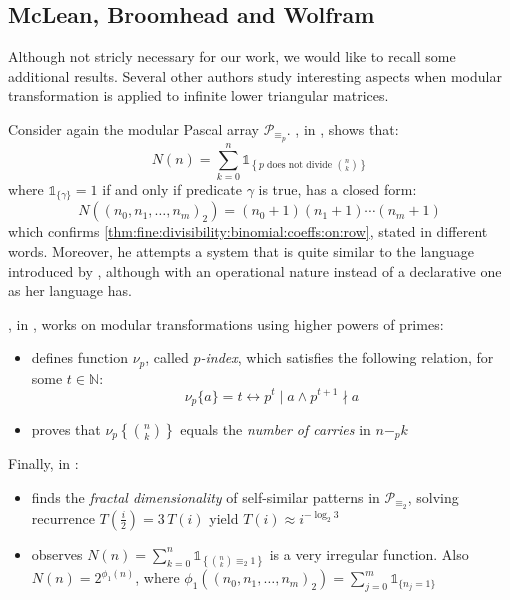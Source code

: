 \subsection{McLean, Broomhead and Wolfram}
\label{subsection:modular:alter:works}
Although not stricly necessary for our work, we would like to recall some
additional results. Several other authors study interesting aspects when
modular transformation is applied to infinite lower triangular matrices.

Consider again the modular Pascal array $\mathcal{P}_{\equiv_{p}}$.
\citeauthor{broomhead:1972}, in \cite{broomhead:1972}, shows that:
\begin{displaymath}
    N(n)=\sum_{k=0}^{n}{\mathbb{1}_{\left\lbrace p\text{ does not divide }{{n}\choose{k}}\right\rbrace}}
\end{displaymath}
where $\mathbb{1}_{\lbrace \gamma \rbrace}=1$ if and only if predicate $\gamma$ is true,
has a closed form:
\begin{displaymath}
    N((n_{0},n_{1},\ldots,n_{m})_{2})=(n_{0}+1)(n_{1}+1)\cdots(n_{m}+1)
\end{displaymath}
which confirms \autoref{thm:fine:divisibility:binomial:coeffs:on:row}, stated in different words.
Moreover, he attempts a system that is quite similar to the language introduced by \citeauthor{sved:1988},
although with an operational nature instead of a declarative one as her language has.

\citeauthor{mclean:1974}, in \cite{mclean:1974}, works on modular transformations using
higher powers of primes:
\begin{itemize}
    \item defines function $\nu_{p}$, called \emph{$p$-index}, which satisfies the following relation,
        for some $t\in\mathbb{N}$: 
        \begin{displaymath}
            \nu_{p}\lbrace a\rbrace =t \leftrightarrow p^{t}\mid a \wedge p^{t+1}\nmid a
        \end{displaymath}
    \item proves that {$\nu_{p}\left\lbrace {{n}\choose{k}}\right\rbrace $} 
        equals the \emph{number of carries} in $n-_{p}k$
\end{itemize}

Finally, \citeauthor{wolfram:1984} in \cite{wolfram:1984}:
\begin{itemize}
    \item finds the \emph{fractal dimensionality} of self-similar patterns in $\mathcal{P}_{\equiv_{2}}$,
        solving recurrence $T\left(\frac{i}{2}\right)=3\,T(i)$ yield $T(i)\approx i^{-\log_{2}{3}}$
    \item observes $N(n)=\sum_{k=0}^{n}{\mathbb{1}_{\left\lbrace{{n}\choose{k}}\equiv_{2}1\right\rbrace}}$ 
        is a very irregular function. Also $N(n)=2^{\phi_{1}(n)}$, where $ \phi_{1}((n_{0},n_{1},\ldots,n_{m})_{2})=
            \sum_{j=0}^{m}{\mathbb{1}_{\lbrace n_{j}=1\rbrace} }$
\end{itemize}
